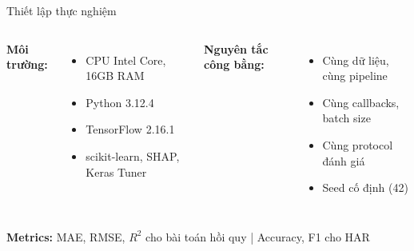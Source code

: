 \documentclass[11pt]{beamer}
\begin{document}
\begin{frame}{Thiết lập thực nghiệm}
\small
\begin{columns}[T]
\textbf{Môi trường:}
\begin{itemize}
    \item CPU Intel Core, 16GB RAM
    \item Python 3.12.4
    \item TensorFlow 2.16.1
    \item scikit-learn, SHAP, Keras Tuner
\end{itemize}

\textbf{Nguyên tắc công bằng:}
\begin{itemize}
    \item Cùng dữ liệu, cùng pipeline
    \item Cùng callbacks, batch size
    \item Cùng protocol đánh giá
    \item Seed cố định (42)
\end{itemize}
\end{columns}

\vspace{0.2cm}
\textbf{Metrics:} MAE, RMSE, $R^2$ cho bài toán hồi quy | Accuracy, F1 cho HAR
\end{frame}
\end{document}
